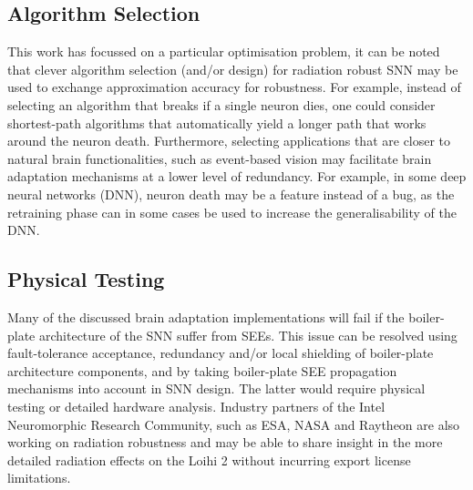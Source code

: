 \subsection{Algorithm Selection}\label{subsec:algorithm_selection}
This work has focussed on a particular optimisation problem, it can be noted that clever algorithm selection (and/or design) for radiation robust SNN may be used to exchange approximation accuracy for robustness. For example, instead of selecting an algorithm that breaks if a single neuron dies, one could consider shortest-path algorithms that automatically yield a longer path that works around the neuron death. Furthermore, selecting applications that are closer to natural brain functionalities, such as event-based vision may facilitate brain adaptation mechanisms at a lower level of redundancy. For example, in some deep neural networks (DNN), neuron death may be a feature instead of a bug, as the retraining phase can in some cases be used to increase the generalisability of the DNN. %

\subsection{Physical Testing}\label{subsec:physical_testing}
Many of the discussed brain adaptation implementations will fail if the boiler-plate architecture of the SNN suffer from SEEs. This issue can be resolved using fault-tolerance acceptance, redundancy and/or local shielding of boiler-plate architecture components, and by taking boiler-plate SEE propagation mechanisms into account in SNN design. The latter would require physical testing or detailed hardware analysis. Industry partners of the Intel Neuromorphic Research Community, such as ESA, NASA and Raytheon are also working on radiation robustness \cite{inrc_meeting} and may be able to share insight in the more detailed radiation effects on the Loihi 2 without incurring export license limitations.